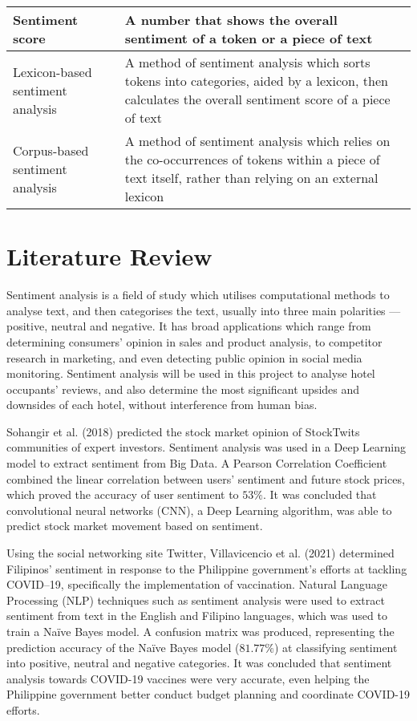 \documentclass[12pt]{scrartcl}
\begin{document}
\begin{table}[htpb]
\begin{center}
\begin{tabular}[]{|p{}|p{}|}
			\hline
			Sentiment score                  & A number that shows the overall sentiment of a token or a piece of text                                                                                      \\
			\hline
			Lexicon-based sentiment analysis & A method of sentiment analysis which sorts tokens into categories, aided by a lexicon, then calculates the overall sentiment score of a piece of text        \\
			\hline
			Corpus-based sentiment analysis  & A method of sentiment analysis which relies on the co-occurrences of tokens within a piece of text itself, rather than relying on an external lexicon        \\
			\hline
		\end{tabular}
	\end{center}
\end{table}

\pagebreak

\section{Literature Review}
Sentiment analysis is a field of study which utilises computational methods to analyse text,
and then categorises the text, usually into three main polarities ---  positive, neutral
and negative. It has broad applications which range from determining consumers' opinion in
sales and product analysis, to competitor research in marketing, and even detecting public
opinion in social media monitoring. Sentiment analysis will be used in this project to
analyse hotel occupants' reviews, and also determine the most significant upsides
and downsides of each hotel, without interference from human bias.

Sohangir et al. (2018) predicted the stock market opinion of StockTwits communities
of expert investors. Sentiment analysis was used in a Deep Learning model to extract
sentiment from Big Data. A Pearson Correlation Coefficient combined the linear correlation
between users' sentiment and future stock prices, which
proved the accuracy of user sentiment to $53\%$.
It was concluded that convolutional neural networks (CNN), a Deep Learning algorithm,
was able to predict stock market movement based on sentiment.

Using the social networking site Twitter, Villavicencio et al. (2021)
determined Filipinos' sentiment in response to the Philippine government's efforts
at tackling COVID--19, specifically the implementation of vaccination. Natural
Language Processing (NLP) techniques such as sentiment analysis were used to
extract sentiment from text in the English and Filipino languages, which was used to
train a Naïve Bayes model. A confusion matrix was produced, representing the
prediction accuracy of the Naïve Bayes model ($81.77\%$) at classifying
sentiment into positive, neutral and negative categories. It was concluded that
sentiment analysis towards COVID-19 vaccines were very accurate, even helping the
Philippine government better conduct budget planning and coordinate COVID-19 efforts.
\end{document}
